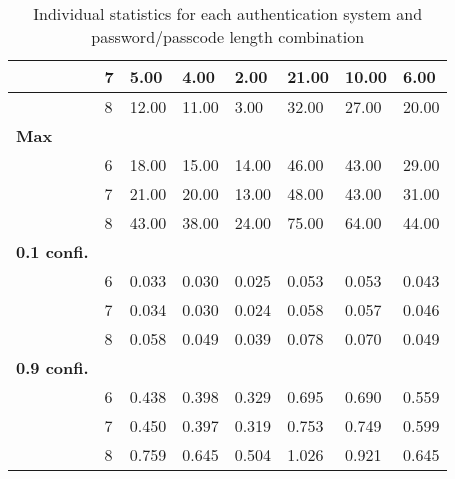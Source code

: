 \documentclass[british,10pt,a4paper]{article}
\begin{document}
\begin{appendices}
\begin{table}[h]
\begin{tabular}{|l|l|l|l|l|l|l|l|}
		 & 7 & 5.00 & 4.00 & 2.00 & 21.00 & 10.00 & 6.00 \\ \hline
		 & 8 & 12.00 & 11.00 & 3.00 & 32.00 & 27.00 & 20.00 \\ \hline
		\textbf{Max} &  &  &  &  &  &  &  \\ \hline
		 & 6 & 18.00 & 15.00 & 14.00 & 46.00 & 43.00 & 29.00 \\ \hline
		 & 7 & 21.00 & 20.00 & 13.00 & 48.00 & 43.00 & 31.00 \\ \hline
		 & 8 & 43.00 & 38.00 & 24.00 & 75.00 & 64.00 & 44.00 \\ \hline
		\textbf{0.1 confi.} &  &  &  &  &  &  &  \\ \hline
		 & 6 & 0.033 & 0.030 & 0.025 & 0.053 & 0.053 & 0.043 \\ \hline
		 & 7 & 0.034 & 0.030 & 0.024 & 0.058 & 0.057 & 0.046 \\ \hline
		 & 8 & 0.058 & 0.049 & 0.039 & 0.078 & 0.070 & 0.049 \\ \hline
		\textbf{0.9 confi.} &  &  &  &  &  &  &  \\ \hline
		 & 6 & 0.438 & 0.398 & 0.329 & 0.695 & 0.690 & 0.559 \\ \hline
		 & 7 & 0.450 & 0.397 & 0.319 & 0.753 & 0.749 & 0.599 \\ \hline
		 & 8 & 0.759 & 0.645 & 0.504 & 1.026 & 0.921 & 0.645 \\ \hline
		\end{tabular}
		\caption{Individual statistics for each authentication system and password/passcode length combination}
	\end{table}
	\clearpage


\end{appendices}
\end{document}
